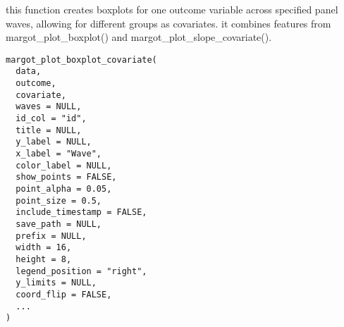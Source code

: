 \documentclass[a4paper]{book}
\begin{document}
%
\begin{Description}
this function creates boxplots for one outcome variable across specified panel waves,
allowing for different groups as covariates. it combines features from
margot\_plot\_boxplot() and margot\_plot\_slope\_covariate().
\end{Description}
%
\begin{Usage}
\begin{verbatim}
margot_plot_boxplot_covariate(
  data,
  outcome,
  covariate,
  waves = NULL,
  id_col = "id",
  title = NULL,
  y_label = NULL,
  x_label = "Wave",
  color_label = NULL,
  show_points = FALSE,
  point_alpha = 0.05,
  point_size = 0.5,
  include_timestamp = FALSE,
  save_path = NULL,
  prefix = NULL,
  width = 16,
  height = 8,
  legend_position = "right",
  y_limits = NULL,
  coord_flip = FALSE,
  ...
)
\end{verbatim}
\end{Usage}
%
\end{document}
